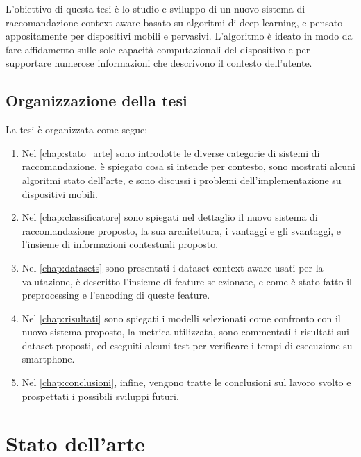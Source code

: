 \documentclass[12pt,italian]{report}
\begin{document}
L'obiettivo di questa tesi è lo studio e sviluppo di un nuovo sistema di raccomandazione context-aware basato su algoritmi di deep learning, e pensato appositamente per dispositivi mobili e pervasivi. L'algoritmo è ideato in modo da fare affidamento sulle sole capacità computazionali del dispositivo e per supportare numerose informazioni che descrivono il contesto dell'utente.

\section{Organizzazione della tesi}
\label{sec:organizzazione}
La tesi è organizzata come segue: 
\begin{enumerate}
\item Nel \autoref{chap:stato_arte} sono introdotte le diverse categorie di sistemi di raccomandazione, è spiegato cosa si intende per contesto, sono mostrati alcuni algoritmi stato dell'arte, e sono discussi i problemi dell'implementazione su dispositivi mobili.

\item Nel \autoref{chap:classificatore} sono spiegati nel dettaglio il nuovo sistema di raccomandazione proposto, la sua architettura, i vantaggi e gli svantaggi, e l'insieme di informazioni contestuali proposto.

\item Nel \autoref{chap:datasets} sono presentati i dataset context-aware usati per la valutazione, è descritto l'insieme di feature selezionate, e come è stato fatto il preprocessing e l'encoding di queste feature.

\item Nel \autoref{chap:risultati} sono spiegati i modelli selezionati come confronto con il nuovo sistema proposto, la metrica utilizzata, sono commentati i risultati sui dataset proposti, ed eseguiti alcuni test per verificare i tempi di esecuzione su smartphone.

\item Nel \autoref{chap:conclusioni}, infine, vengono tratte le conclusioni sul lavoro svolto e prospettati i possibili sviluppi futuri. 
\end{enumerate}


% 
% 

\chapter{Stato dell'arte}
\label{chap:stato_arte}
\end{document}
